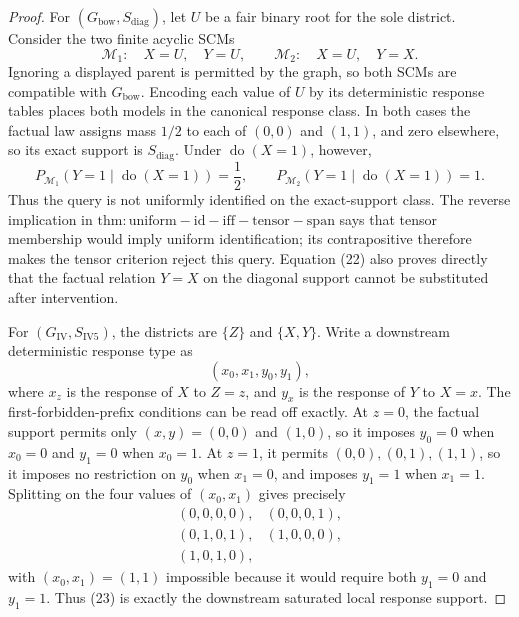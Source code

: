 \documentclass{article}
\begin{document}
\begin{proof}
For \((G_{\mathrm{bow}},S_{\mathrm{diag}})\), let \(U\) be a fair binary root for the sole district.  Consider the two finite acyclic SCMs
\[
\mathcal M_1:\quad X=U,\quad Y=U,
\qquad
\mathcal M_2:\quad X=U,\quad Y=X.                            \tag{21}
\]
Ignoring a displayed parent is permitted by the graph, so both SCMs are compatible with \(G_{\mathrm{bow}}\).  Encoding each value of \(U\) by its deterministic response tables places both models in the canonical response class.  In both cases the factual law assigns mass \(1/2\) to each of \((0,0)\) and \((1,1)\), and zero elsewhere, so its exact support is \(S_{\mathrm{diag}}\).  Under \(\operatorname{do}(X=1)\), however,
\[
P_{\mathcal M_1}(Y=1\mid\operatorname{do}(X=1))=\frac12,
\qquad
P_{\mathcal M_2}(Y=1\mid\operatorname{do}(X=1))=1.           \tag{22}
\]
Thus the query is not uniformly identified on the exact-support class.  The reverse implication in \(\mathrm{thm:uniform-id-iff-tensor-span}\) says that tensor membership would imply uniform identification; its contrapositive therefore makes the tensor criterion reject this query.  Equation (22) also proves directly that the factual relation \(Y=X\) on the diagonal support cannot be substituted after intervention.

For \((G_{\mathrm{IV}},S_{\mathrm{IV5}})\), the districts are \(\{Z\}\) and \(\{X,Y\}\).  Write a downstream deterministic response type as
\[
(x_0,x_1,y_0,y_1),
\]
where \(x_z\) is the response of \(X\) to \(Z=z\), and \(y_x\) is the response of \(Y\) to \(X=x\).  The first-forbidden-prefix conditions can be read off exactly.  At \(z=0\), the factual support permits only \((x,y)=(0,0)\) and \((1,0)\), so it imposes \(y_0=0\) when \(x_0=0\) and \(y_1=0\) when \(x_0=1\).  At \(z=1\), it permits \((0,0),(0,1),(1,1)\), so it imposes no restriction on \(y_0\) when \(x_1=0\), and imposes \(y_1=1\) when \(x_1=1\).  Splitting on the four values of \((x_0,x_1)\) gives precisely
\[
\begin{array}{cc}
(0,0,0,0),&(0,0,0,1),\\
(0,1,0,1),&(1,0,0,0),\\
(1,0,1,0),
\end{array}                                                    \tag{23}
\]
with \((x_0,x_1)=(1,1)\) impossible because it would require both \(y_1=0\) and \(y_1=1\).  Thus (23) is exactly the downstream saturated local response support.


\end{proof}
\end{document}
